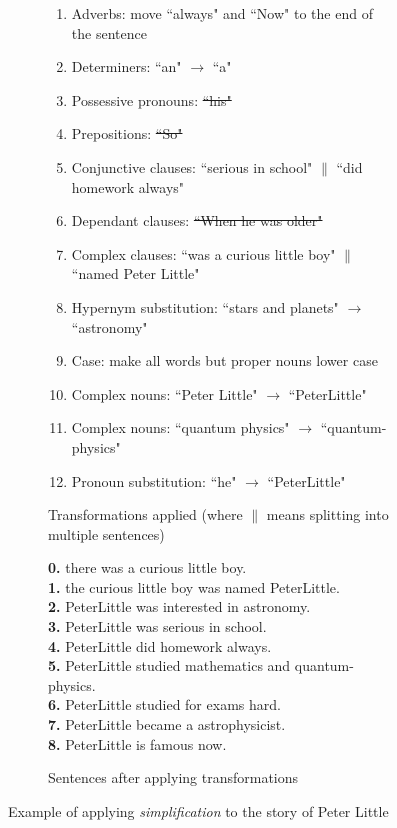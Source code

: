 \begin{figure}[H]
\begin{subfigure}{\textwidth}
\begin{displayquote}
\begin{enumerate}[label=\protect\circled{\alph*}]
\item Adverbs: move ``always" and ``Now" to the end of the sentence
\item Determiners: ``an" $\rightarrow$ ``a"
\item Possessive pronouns: \st{``his"}
\item Prepositions: \st{``So"}
\item Conjunctive clauses: ``serious in school" $\|$ ``did homework always"
\item Dependant clauses: \st{``When he was older"}
\item Complex clauses: ``was a curious little boy" $\|$ ``named Peter Little"
\item Hypernym substitution: ``stars and planets" $\rightarrow$ ``astronomy"
\item Case: make all words but proper nouns lower case
\item Complex nouns: ``Peter Little" $\rightarrow$ ``PeterLittle"
\item Complex nouns: ``quantum physics" $\rightarrow$ ``quantum-physics"
\item Pronoun substitution: ``he" $\rightarrow$ ``PeterLittle"
\end{enumerate}
\end{displayquote}
\caption{Transformations applied (where $\|$ means splitting into multiple sentences)}
\vspace{\baselineskip}
\end{subfigure}
\begin{subfigure}{\textwidth}
\begin{displayquote}
\textbf{0.} there was a curious little boy.\\
\textbf{1.}  the curious little boy was named  PeterLittle.\\
\textbf{2.}  PeterLittle was interested in  astronomy.\\
\textbf{3.}  PeterLittle was serious in school.\\
\textbf{4.}  PeterLittle did  homework  always.\\
\textbf{5.}  PeterLittle studied mathematics and  quantum-physics.\\
\textbf{6.} PeterLittle studied for  exams hard.\\
\textbf{7.} PeterLittle became  a astrophysicist.\\
\textbf{8.} PeterLittle is famous  now.
\caption{Sentences after applying transformations}
\end{displayquote}
\end{subfigure}
\caption{Example of applying \textit{simplification} to the story of Peter Little}
\label{fig:simplification_example}
\end{figure}

